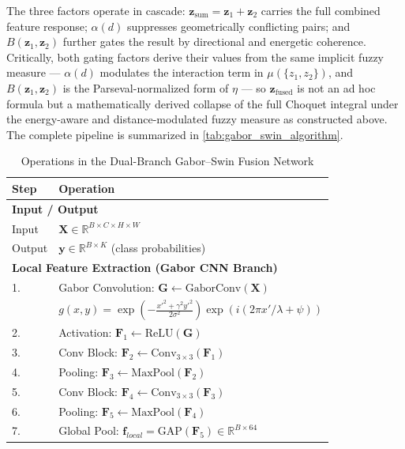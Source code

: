 \documentclass[preprint,12pt]{elsarticle}
\begin{document}
The three factors operate in cascade: $\mathbf{z}_{\text{sum}} = \mathbf{z}_1+\mathbf{z}_2$ carries the full combined feature response; $\alpha(d)$ suppresses geometrically conflicting pairs; and $B(\mathbf{z}_1,\mathbf{z}_2)$ further gates the result by directional and energetic coherence. Critically, both gating factors derive their values from the same implicit fuzzy measure — $\alpha(d)$ modulates the interaction term in $\mu(\{z_1,z_2\})$, and $B(\mathbf{z}_1,\mathbf{z}_2)$ is the Parseval-normalized form of $\eta$ — so $\mathbf{z}_{\text{fused}}$ is not an ad hoc formula but a mathematically derived collapse of the full Choquet integral under the energy-aware and distance-modulated fuzzy measure as constructed above. The complete pipeline is summarized in \autoref{tab:gabor_swin_algorithm}.
\begin{table}[!h]
\centering
\caption{Operations in the Dual-Branch Gabor--Swin Fusion Network}
\label{tab:gabor_swin_algorithm}
\footnotesize
\setlength{\tabcolsep}{3pt}
\renewcommand{\arraystretch}{0.9}

\begin{tabular}{@{}ll@{}}
\toprule
\textbf{Step} & \textbf{Operation} \\
\midrule

\multicolumn{2}{l}{\textbf{Input / Output}} \\
Input & $\mathbf{X} \in \mathbb{R}^{B \times C \times H \times W}$ \\
Output & $\mathbf{y} \in \mathbb{R}^{B \times K}$ (class probabilities) \\

\midrule
\multicolumn{2}{l}{\textbf{Local Feature Extraction (Gabor CNN Branch)}} \\

1. & Gabor Convolution: $\mathbf{G} \leftarrow \text{GaborConv}(\mathbf{X})$ \\
 & \quad $g(x,y)=\exp\!\left(-\frac{x'^2+\gamma^2y'^2}{2\sigma^2}\right)
      \exp\!\left(i(2\pi x'/\lambda+\psi)\right)$ \\

2. & Activation: $\mathbf{F}_1 \leftarrow \text{ReLU}(\mathbf{G})$ \\
3. & Conv Block: $\mathbf{F}_2 \leftarrow \text{Conv}_{3\times3}(\mathbf{F}_1)$ \\
4. & Pooling: $\mathbf{F}_3 \leftarrow \text{MaxPool}(\mathbf{F}_2)$ \\
5. & Conv Block: $\mathbf{F}_4 \leftarrow \text{Conv}_{3\times3}(\mathbf{F}_3)$ \\
6. & Pooling: $\mathbf{F}_5 \leftarrow \text{MaxPool}(\mathbf{F}_4)$ \\
7. & Global Pool: $\mathbf{f}_{local} = \text{GAP}(\mathbf{F}_5) \in \mathbb{R}^{B \times 64}$ \\


\end{tabular}
\end{table}
\end{document}

